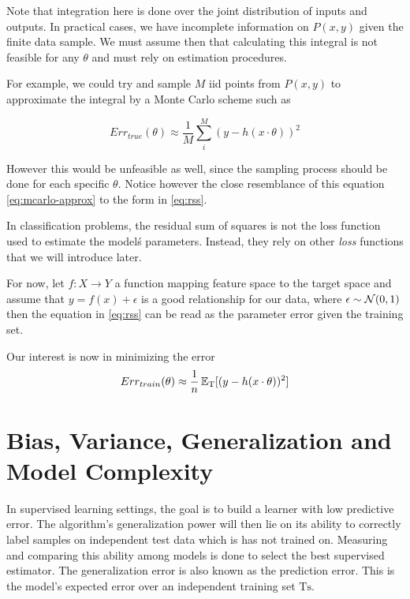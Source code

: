 Note that integration here is done over the joint distribution of inputs and outputs. In practical cases, we have incomplete information on $P(x,y)$ given the finite data sample.
We must assume then that calculating this integral is not feasible for any $\theta$ and must rely on estimation procedures.

For example, we could try and sample $M$ iid points from $P(x,y)$ to approximate the integral by a Monte Carlo scheme such as

\begin{equation} \label{eq:mcarlo-approx}
    Err_{true}(\theta)  \approx \frac{1}{M} \sum_i^M ( y - h(x \cdot \theta) )^2
\end{equation}

However this would be unfeasible as well, since the sampling process should be done for each specific $\theta$. Notice however the close resemblance of this equation \ref{eq:mcarlo-approx} to the form in \ref{eq:rss}.

In classification problems, the residual sum of squares is not the loss function used to estimate the model\'s parameters. Instead, they rely on other \textit{loss} functions that we will introduce later.

For now, let $f: X \rightarrow Y$ a function mapping feature space to the target space and assume that $y  =  f(x)  +  \epsilon $ is a good relationship for our data, where $\epsilon \sim \operatorname{\mathcal{N}}(0,1) $ then the equation in \ref{eq:rss} can be read as the parameter error given the training set.

Our interest is now in minimizing the error
\[
Err_{train}(\theta) \approx \frac{1}{n} \operatorname{\mathbb{E}}_{ \mathrm{T}}[(y - h(x \cdot \theta) )^2]
\]





\section{Bias, Variance, Generalization and Model Complexity}\label{section-biasVariance}

In supervised learning settings, the goal is to build a learner with low predictive error. The algorithm's generalization power will then lie on its ability to correctly label samples on independent test data which is has not trained on. Measuring and comparing this ability among models is done to select the best supervised estimator. The generalization error is also known as the prediction error. This is the model's expected error over an independent training set $\mathrm{Ts}$.


